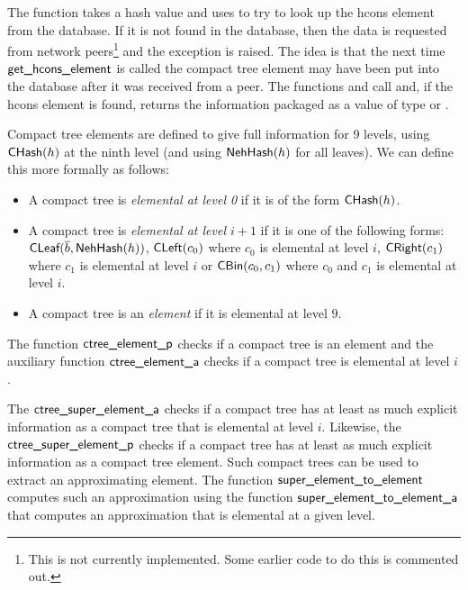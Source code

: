 The function {} takes a hash value and
uses {} to try to look up the hcons element from the database.
If it is not found in the database,
then the data is requested from network peers\footnote{This is not currently implemented. Some earlier code to do this is commented out.}
and the exception {} is raised.
The idea is that the next time ${\constr{get\_hcons\_element}}$ is
called the compact tree element
may have been put into the database after it was received from a peer.
The functions {} and {}
call {} and, if the hcons element is found,
returns the information packaged as a value of type {} or {}.

Compact tree elements are defined to give full information for 9 levels, using
${\constr{CHash}}(h)$ at the ninth level (and using ${\constr{NehHash}}(h)$ for all leaves).
We can define this more formally as follows:
\begin{itemize}
\item A compact tree is {\em{elemental at level 0}} if it is of the form ${\constr{CHash}}(h)$.
\item A compact tree is {\em{elemental at level $i+1$}} if it is one of the following forms:
${\constr{CLeaf}}(\overline{b},{\constr{NehHash}}(h))$,
${\constr{CLeft}}(c_0)$ where $c_0$ is elemental at level $i$,
${\constr{CRight}}(c_1)$ where $c_1$ is elemental at level $i$
or
${\constr{CBin}}(c_0,c_1)$ where $c_0$ and $c_1$ is elemental at level $i$.
\item A compact tree is an {\em{element}} if it is elemental at level $9$.
\end{itemize}
The function ${\func{ctree\_element\_p}}$ checks if a compact tree is an element
and the auxiliary function ${\func{ctree\_element\_a}}$ checks if a compact
tree is elemental at level $i$.

The ${\func{ctree\_super\_element\_a}}$ checks if a compact tree has
at least as much explicit information as a compact tree that is elemental at level $i$.
Likewise, the ${\func{ctree\_super\_element\_p}}$ checks if a compact tree
has at least as much explicit information as a compact tree element.
Such compact trees can be used to extract an approximating element.
The function ${\func{super\_element\_to\_element}}$ computes such an approximation
using the function ${\func{super\_element\_to\_element\_a}}$
that computes an approximation that is elemental at a given level.

